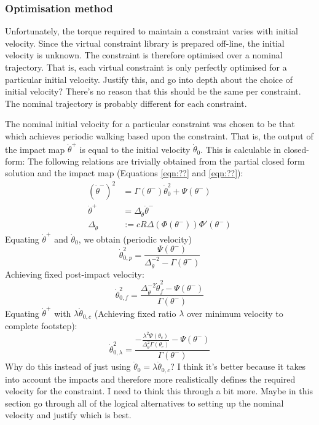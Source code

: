 \subsubsection{Optimisation method}
Unfortunately, the torque required to maintain a constraint varies with initial velocity. Since the virtual constraint library is prepared off-line, the initial velocity is unknown. The constraint is therefore optimised over a nominal trajectory. That is, each virtual constraint is only perfectly optimised for a particular initial velocity. {\color{red} Justify this, and go into depth about the choice of initial velocity? There's no reason that this should be the same per constraint. The nominal trajectory is probably different for each constraint.}

The nominal initial velocity for a particular constraint was chosen to be that which achieves periodic walking based upon the constraint. That is, the output of the impact map $\dot{\theta}^+$ is equal to the initial velocity $\dot{\theta}_0$. This is calculable in closed-form: The following relations are trivially obtained from the partial closed form solution and the impact map (Equations \ref{eqn:??} and \ref{eqn:??}):
\begin{subequations}
\begin{align}
	\left(\dot{\theta}^-\right)^2 &= \Gamma(\theta^-)\dot{\theta}_0^2 + \Psi(\theta^-) \\
	\dot{\theta}^+ &= \Delta_{\dot{\theta}}\dot{\theta}^- \\
	\Delta_{\dot{\theta}} &:= cR\Delta(\Phi(\theta^-))\Phi'(\theta^-)
\end{align}
\end{subequations}
Equating $\dot{\theta}^+$ and $\dot{\theta}_0$, we obtain (periodic velocity)
\begin{equation}
	\dot{\theta}_{0,p}^2 = \frac{\Psi(\theta^-)}{\Delta_{\dot{\theta}}^{-2} - \Gamma(\theta^-)}
\end{equation}
Achieving fixed post-impact velocity:
\begin{equation}
	\dot{\theta}_{0,f}^2 = \frac{\Delta_{\dot{\theta}}^{-2}\dot{\theta}_f^2 - \Psi(\theta^-)} {\Gamma(\theta^-)}
\end{equation}
Equating $\dot{\theta}^+$ with $\lambda\dot{\theta}_{0,c}$ (Achieving fixed ratio $\lambda$ over minimum velocity to complete footstep):
\begin{equation}
	\dot{\theta}_{0,\lambda}^2 = \frac{-\frac{\lambda^2 \Psi(\theta_c)}{\Delta_{\dot{\theta}}^2 \Gamma(\theta_c)} - \Psi(\theta^-)} {\Gamma(\theta^-)}
\end{equation}
{\color{blue} Why do this instead of just using $\dot{\theta}_0 = \lambda\dot{\theta}_{0,c}$? I think it's better because it takes into account the impacts and therefore more realistically defines the required velocity for the constraint. I need to think this through a bit more. Maybe in this section go through all of the logical alternatives to setting up the nominal velocity and justify which is best.}


